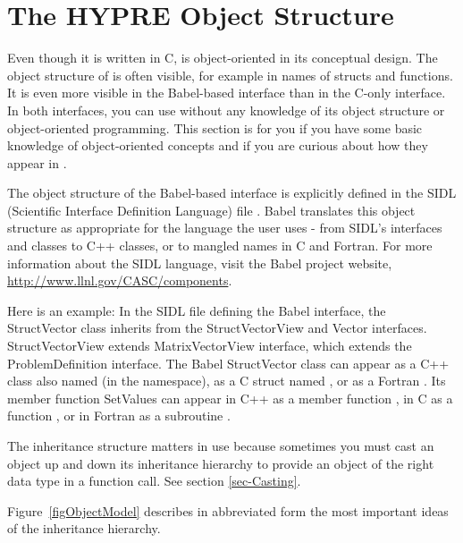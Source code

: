 \section{The HYPRE Object Structure}
\label{sec-ObjectStructure}

Even though it is written in C, \hypre{} is object-oriented in its
conceptual design.  The object structure of \hypre{} is often visible,
for example in names of structs and functions.  It is even more
visible in the Babel-based interface than in the C-only interface.  In
both interfaces, you can use \hypre{} without any knowledge of its
object structure or object-oriented programming.  This section is for
you if you have some basic knowledge of object-oriented concepts and
if you are curious about how they appear in \hypre{}.

The object structure of the Babel-based interface is explicitly
defined in the SIDL (Scientific Interface Definition Language) file
.  Babel translates this object structure as
appropriate for the language the user uses - from SIDL's interfaces
and classes to C++ classes, or to mangled names in C and Fortran.
For more information about the SIDL language, visit the Babel project
website, \url{http://www.llnl.gov/CASC/components}.

Here is an example: In the SIDL file defining the Babel interface, the
StructVector class inherits from the StructVectorView and Vector
interfaces.  StructVectorView extends MatrixVectorView interface,
which extends the ProblemDefinition interface.  The Babel StructVector
class can appear as a C++ class also named  (in the
 namespace), as a C struct named
, or as a Fortran
.  Its member function SetValues can appear in C++ as a
member function , in C as a function
, or in Fortran as a subroutine
.

The inheritance structure matters in use because sometimes you must
cast an object up and down its inheritance hierarchy to provide an
object of the right data type in a function call.  See section
\ref{sec-Casting}.

Figure~\ref{figObjectModel} describes in abbreviated form the most
important ideas of the \hypre{} inheritance hierarchy.


